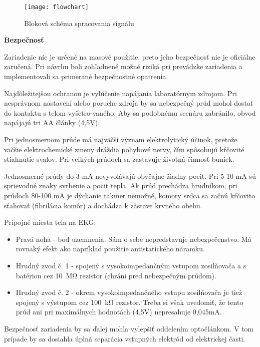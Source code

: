 \documentclass[titlepage,12pt]{article}
\begin{document}
\newpage
\begin{figure}[!ht]
\begin{center}
\texttt{[image: flowchart]}
\caption{Bloková schéma spracovania signálu}
\end{center}
\end{figure}

\bigskip

\textbf{Bezpečnosť}

Zariadenie nie je určené na masové použitie, preto jeho bezpečnosť nie je oficiálne zaručená. Pri návrhu boli zohľadnené možné riziká pri prevádzke zariadenia a implementovali sa primerané bezpečnostné opatrenia. 

Najdôležitejšou ochranou je vylúčenie napájania laboratórnym zdrojom. Pri nesprávnom nastavení alebo poruche zdroja by sa nebezpečný prúd mohol dostať do kontaktu s telom vyšetro-vaného. Aby sa podobnému scenáru zabránilo, obvod napájajú tri AA články (4,5V). 

Pri jednosmernom prúde má najväčší význam elektrolytický účinok, pretože väčšie elektrochemické zmeny dráždia pohybové nervy, čím spôsobujú kŕčovité stiahnutie svalov. Pri veľkých prúdoch sa zastavuje životná činnosť buniek.

Jednosmerné prúdy do 3 mA nevyvolávajú obyčajne žiadny pocit. Pri 5-10 mA sú sprievodné znaky svrbenie a pocit tepla. Ak prúd prechádza hrudníkom, pri prúdoch 80-100 mA je dýchanie takmer nemožné, komory srdca sa začnú kŕčovito sťahovať (fibrilácia komôr) a dochádza \linebreak k zástave krvného obehu.

Prípojné miesta tela na EKG:
\begin{itemize}
	\item Pravá noha - bod uzemnenia. Sám o sebe nepredstavuje nebezpečenstvo. Má rovnaký efekt ako napríklad použitie antistatického náramku.
	\item Hrudný zvod č. 1 - spojený s vysokoimpedančným vstupom zosilňovača a s batériou cez \SI{10}{\mega\ohm} rezistor (chráni pred nebezpečným prúdom).
	\item Hrudný zvod č. 2 - okrem vysokoimpedančného vstupu zosilňovača je tiež spojený \linebreak s výstupom cez \SI{100}{\kilo\ohm} rezistor. Treba si však uvedomiť, že tento prúd ani pri maximálnych hodnotách (4,5V) nepresahuje 0,045mA.
\end{itemize}

Bezpečnosť zariadenia by sa ďalej mohla vylepšiť oddelením optočlánkom. V tom prípade by sa dosiahla úplná separácia vstupných elektród od elektrickej časti.
\newpage
\end{document}
